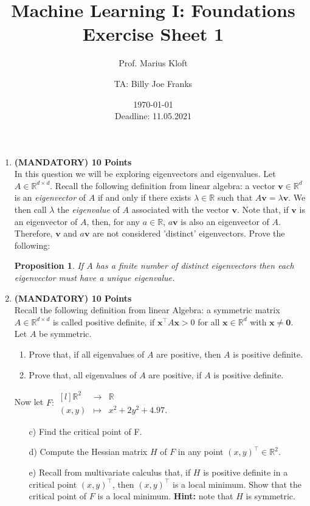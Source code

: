 \documentclass[]{scrartcl}
\author{Prof. Marius Kloft \and TA: Billy Joe Franks}
\title{Machine Learning I: Foundations \\ Exercise Sheet 1}
\date{\today\\Deadline: 11.05.2021}
\newcommand{\R}{\mathbb{R}}
\newcommand{\bx}{\mathbf{x}}
\newcommand{\bv}{\mathbf{v}}
\newtheorem{prop}{Proposition}
\begin{document}
\maketitle

\begin{enumerate}

\item \textbf{(MANDATORY) 10 Points}\\
In this question we will be exploring eigenvectors and eigenvalues. Let $A \in \R^{d \times d}$. Recall the following definition from linear algebra: a vector $\bv \in \R^d$ is an {\em eigenvector} of $A$ if and only if there exists $\lambda \in \R$ such that $A \bv=\lambda \bv$. We then call $\lambda$ the {\em eigenvalue} of $A$ associated with the vector $\bv$. Note that, if $\bv$ is an eigenvector of $A$, then, for any $a \in \R$, $a\bv$ is also an eigenvector of $A$. Therefore, $\bv$ and $a\bv$ are not considered 'distinct' eigenvectors.
Prove the following:
	\begin{prop}
		If $A$ has a finite number of distinct eigenvectors then each eigenvector must have a unique eigenvalue.
	\end{prop}

\item \textbf{(MANDATORY) 10 Points}\\
Recall the following definition from linear Algebra: a symmetric matrix $A\in\R^{d\times d}$  is called positive definite, if $\bx^\top A\bx>0$ for all $\bx\in\R^d$ with $\bx\neq\mathbf{0}$. Let $A$ be symmetric.
\begin{enumerate}
    \item Prove that, if all eigenvalues of $A$ are positive, then $A$ is positive definite. 
    \item Prove that, all eigenvalues of $A$ are positive, if $A$ is positive definite.
		\end{enumerate}
		 Now let $F:\begin{matrix*}[l]\R^2&\rightarrow&\R \\ (x,y) &\mapsto& x^2 + 2y^2  + 4.97.\end{matrix*}$ 
\begin{enumerate}
    \item[c)] Find the critical point of F.
    \item[d)] Compute the Hessian matrix $H$ of $F$ in any point $(x,y)^\top\in\R^2$. 
    \item[e)] Recall from multivariate calculus that, if $H$ is positive definite in a critical point $(x,y)^\top$, then $(x,y)^\top$ is a local minimum. Show that the critical point of $F$ is a local minimum. 
		 \textbf{Hint:} note that  $H$ is symmetric.
    \end{enumerate}


\end{enumerate}
\end{document}
